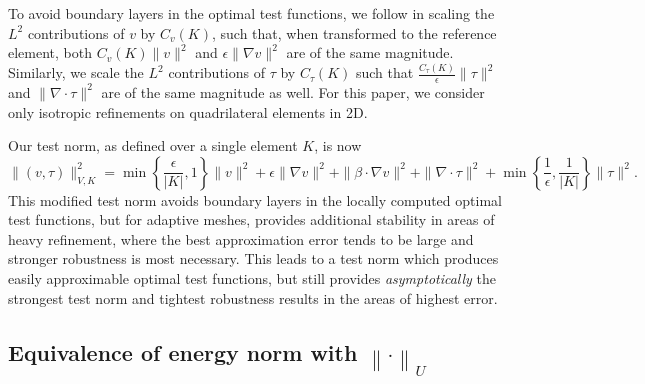 \documentclass[11pt,onecolumn]{scrartcl}
\newcommand{\nor}[1]{\left\| #1 \right\|}
\newcommand{\grad}{\nabla}
\renewcommand{\div}{\grad \cdot}
\begin{document}
To avoid boundary layers in the optimal test functions, we follow \cite{DPGrobustness} in scaling the $L^2$ contributions of $v$ by $C_v(K)$, such that, when transformed to the reference element, both $C_v(K)\|v\|^2$ and $\epsilon\|\grad v\|^2$ are of the same magnitude. Similarly, we scale the $L^2$ contributions of $\tau$ by $C_\tau(K)$ such that $\frac{C_\tau(K)}{\epsilon} \|\tau\|^2$ and $\|\div \tau\|^2$ are of the same magnitude as well. For this paper, we consider only isotropic refinements on quadrilateral elements in 2D.

Our test norm, as defined over a single element $K$, is now
\[
\|\left(v,\tau\right)\|_{V,K}^2 = \min\left\{\frac{\epsilon}{|K|},1\right\}\|v\|^2 + \epsilon \|\grad v\|^2 + \|\beta \cdot \grad v\|^2 + \| \div \tau\|^2 + \min\left\{\frac{1}{\epsilon},\frac{1}{|K|}\right\}\|\tau\|^2.
\]
This modified test norm avoids boundary layers in the locally computed optimal test functions, but for adaptive meshes, provides additional stability in areas of heavy refinement, where the best approximation error tends to be large and stronger robustness is most necessary.  This leads to a test norm which produces easily approximable optimal test functions, but still provides \textit{asymptotically} the strongest test norm and tightest robustness results in the areas of highest error. 

\subsection{Equivalence of energy norm with $\nor{\cdot}_U$}
\label{sec:main_bounds}
\end{document}
